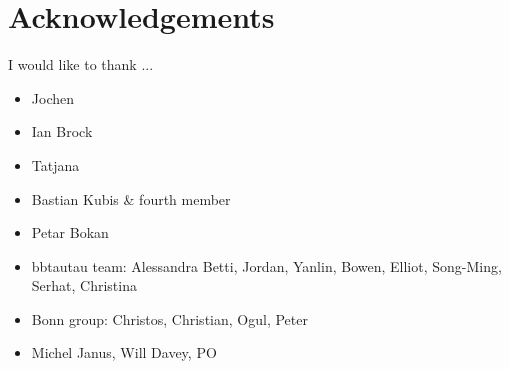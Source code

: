 \chapter*{Acknowledgements}
\label{sec:ack}

I would like to thank ...

\begin{itemize}
\item Jochen
\item Ian Brock
\item Tatjana
\item Bastian Kubis \& fourth member
\item Petar Bokan
\item bbtautau team: Alessandra Betti, Jordan, Yanlin, Bowen, Elliot, Song-Ming, Serhat, Christina
\item Bonn group: Christos, Christian, Ogul, Peter
\item Michel Janus, Will Davey, PO
\end{itemize}

